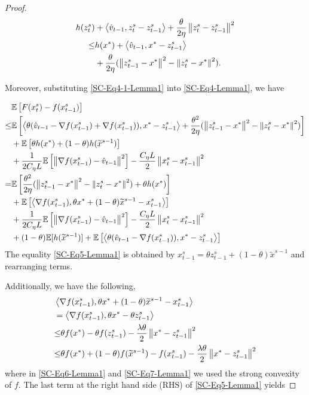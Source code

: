 \documentclass{article}
\newcommand*{\E}{\mathbb{E}}
\newcommand{\norm}[1]{\left\lVert#1\right\rVert}
\newcommand{\Iprod}[2]{\left\langle #1,#2\right\rangle}
\theoremstyle{definition}
\theoremstyle{remark}
\begin{document}
{\begin{proof}
\begin{align}
h(z_{t}^s) &+ \Iprod{\hat{v}_{t-1}}{z_{t}^s-z_{t-1}^s}+{\frac{\theta}{2\eta}}\norm{z_{t}^s-z_{t-1}^s}^2  \notag\\
\leq& h(x^*)+\Iprod{\hat{v}_{t-1}}{x^* - z_{t-1}^s}\notag\\
&+{\frac{\theta}{2\eta}}(\norm{z_{t-1}^s-x^*}^2-\norm{z_{t}^s-x^*}^2)\label{SC-Eq4-1-Lemma1}.  
\end{align}

Moreover, substituting \eqref{SC-Eq4-1-Lemma1} into  \eqref{SC-Eq4-Lemma1}, we have

\begin{align}
&\E\left[F(x_{t}^s) -f(x_{t-1}^s)\right]\notag\\
{\leq}&\E\left[\Iprod{\theta(\hat{v}_{t-1}-\nabla f(x_{t-1}^s)+\nabla f(x_{t-1}^s))}{x^* - z_{t-1}^s}+{\frac{\theta^2}{2\eta}}(\norm{z_{t-1}^s-x^*}^2-\norm{z_{t}^s-x^*}^2)\right]\notag\\
&+\E\left[\theta h(x^*)+(1-\theta) h(\widetilde{x}^{s-1})\right]\notag\\
&+\frac{1}{2C_{\eta} L}\E\left[\norm{\nabla f(x_{t-1}^s)-\hat{v}_{t-1}}^2\right]-\frac{C_{\eta} L}{2}\norm{x_{t}^s-x_{t-1}^s}^2\\
 =& \E\left[{\frac{ \theta^2}{2\eta}}(\norm{z_{t-1}^s-x^*}^2-\norm{z_{t}^s-x^*}^2)+\theta h(x^*)\right]\notag\\
&+\E\left[\Iprod{\nabla f(x_{t-1}^s)}{\theta x^*+(1-\theta)\widetilde{x}^{s-1}-{x}^{s}_{t-1}}\right]\notag\\
&+\frac{1}{2C_{\eta} L}\E\left[\norm{\nabla f(x_{t-1}^s)-\hat{v}_{t-1}}^2\right]-\frac{C_{\eta} L}{2}\norm{x_{t}^s-x_{t-1}^s}^2\notag\\
&+(1-\theta) \E[h(\widetilde{x}^{s-1})]+\E\left[\Iprod{\theta(\hat{v}_{t-1}-\nabla f(x_{t-1}^s))}{x^* - z_{t-1}^s}\right]\label{SC-Eq5-Lemma1}
\raisetag{18pt}
\end{align}
The equality \eqref{SC-Eq5-Lemma1} is obtained by $x_{t-1}^s = \theta z_{t-1}^s+(1-\theta)\widetilde{x}^{s-1}$ and rearranging terms. 

Additionally, we have the following,
\begin{align}
&\Iprod{\nabla f(x_{t-1}^s)}{\theta x^*+(1-\theta)\widetilde{x}^{s-1}-{x}^{s}_{t-1}}\notag\\
&= \Iprod{\nabla f(x_{t-1}^s)}{\theta x^*-\theta{z}^{s}_{t-1}}\notag\\
&{\leq} \theta f(x^*)-\theta f(z_{t-1}^s)-\frac{\lambda\theta}{2}\norm{x^*-z_{t-1}^s}^2\label{SC-Eq6-Lemma1}\\
&{\leq} \theta f(x^*)+(1-\theta)f(\widetilde{x}^{s-1})-f(x_{t-1}^s)-\frac{\lambda\theta}{2}\norm{x^*-z_{t-1}^s}^2\label{SC-Eq7-Lemma1}
\end{align}
where in \eqref{SC-Eq6-Lemma1} and \eqref{SC-Eq7-Lemma1} we used the strong convexity of $f$. The last term at the right hand side (RHS) of \eqref{SC-Eq5-Lemma1} yields


\end{proof}}
\end{document}

